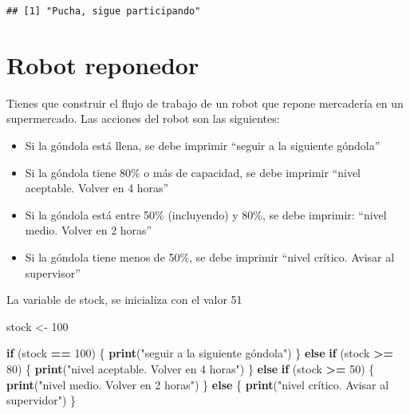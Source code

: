 \documentclass[
]{article}
\newenvironment{Shaded}{\begin{snugshade}}{\end{snugshade}}
\newcommand{\ControlFlowTok}[1]{\textcolor[rgb]{0.13,0.29,0.53}{\textbf{#1}}}
\newcommand{\DecValTok}[1]{\textcolor[rgb]{0.00,0.00,0.81}{#1}}
\newcommand{\FunctionTok}[1]{\textcolor[rgb]{0.13,0.29,0.53}{\textbf{#1}}}
\newcommand{\NormalTok}[1]{#1}
\newcommand{\OtherTok}[1]{\textcolor[rgb]{0.56,0.35,0.01}{#1}}
\newcommand{\SpecialCharTok}[1]{\textcolor[rgb]{0.81,0.36,0.00}{\textbf{#1}}}
\newcommand{\StringTok}[1]{\textcolor[rgb]{0.31,0.60,0.02}{#1}}
\providecommand{\tightlist}{%
  \setlength{\itemsep}{0pt}\setlength{\parskip}{0pt}}
\begin{document}
\begin{verbatim}
## [1] "Pucha, sigue participando"
\end{verbatim}

\hypertarget{robot-reponedor}{%
\section{Robot reponedor}\label{robot-reponedor}}

Tienes que construir el flujo de trabajo de un robot que repone
mercadería en un supermercado. Las acciones del robot son las
siguientes:

\begin{itemize}
\tightlist
\item
  Si la góndola está llena, se debe imprimir ``seguir a la siguiente
  góndola''
\item
  Si la góndola tiene 80\% o más de capacidad, se debe imprimir ``nivel
  aceptable. Volver en 4 horas''
\item
  Si la góndola está entre 50\% (incluyendo) y 80\%, se debe imprimir:
  ``nivel medio. Volver en 2 horas''
\item
  Si la góndola tiene menos de 50\%, se debe imprimir ``nivel crítico.
  Avisar al supervisor''
\end{itemize}

La variable de stock, se inicializa con el valor 51

\begin{Shaded}
\begin{Highlighting}[]
\NormalTok{stock }\OtherTok{\textless{}{-}} \DecValTok{100}
\end{Highlighting}
\end{Shaded}

\begin{Shaded}
\begin{Highlighting}[]
\ControlFlowTok{if}\NormalTok{ (stock }\SpecialCharTok{==} \DecValTok{100}\NormalTok{) \{}
  \FunctionTok{print}\NormalTok{(}\StringTok{"seguir a la siguiente góndola"}\NormalTok{)}
\NormalTok{\} }\ControlFlowTok{else} \ControlFlowTok{if}\NormalTok{ (stock }\SpecialCharTok{\textgreater{}=} \DecValTok{80}\NormalTok{) \{}
  \FunctionTok{print}\NormalTok{(}\StringTok{"nivel aceptable. Volver en 4 horas"}\NormalTok{)}
\NormalTok{\} }\ControlFlowTok{else} \ControlFlowTok{if}\NormalTok{ (stock }\SpecialCharTok{\textgreater{}=} \DecValTok{50}\NormalTok{) \{}
  \FunctionTok{print}\NormalTok{(}\StringTok{"nivel medio. Volver en 2 horas"}\NormalTok{)}
\NormalTok{\} }\ControlFlowTok{else}\NormalTok{ \{}
  \FunctionTok{print}\NormalTok{(}\StringTok{"nivel crítico. Avisar al supervidor"}\NormalTok{)}
\NormalTok{\}}
\end{Highlighting}
\end{Shaded}
\end{document}

